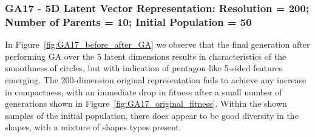 \documentclass{article}
\begin{document}
\subsubsection*{GA17 - 5D Latent Vector Representation: Resolution = 200; Number of Parents = 10; Initial Population = 50}

In Figure~\ref{fig:GA17_before_after_GA} we observe that the final generation after performing GA over the 5 latent dimensions results in characteristics of the smoothness of circles, but with indication of pentagon like 5-sided features emerging. The 200-dimension original representation fails to achieve any increase in compactness, with an immediate drop in fitness after a small number of generations shown in Figure~\ref{fig:GA17_original_fitness}. Within the shown samples of the initial population, there does appear to be good diversity in the shapes, with a mixture of shapes types present.
\end{document}
